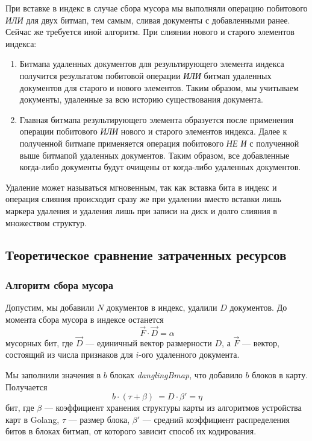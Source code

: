 При вставке в индекс в случае сбора мусора мы выполняли операцию побитового
\textit{ИЛИ} для двух битмап, тем самым, сливая документы с добавленными ранее.
Сейчас же требуется иной алгоритм. При слиянии нового и старого элементов
индекса:
\begin{enumerate}
    \item Битмапа удаленных документов для результирующего элемента индекса
    получится результатом побитовой операции \textit{ИЛИ} битмап удаленных
    документов для старого и нового элементов. Таким образом, мы учитываем
    документы, удаленные за всю историю существования документа.
    \item Главная битмапа результирующего элемента образуется после применения
    операции побитового \textit{ИЛИ} нового и старого элементов индекса. Далее к 
    полученной битмапе применяется операция побитового \textit{НЕ И} с полученной
    выше битмапой удаленных документов. Таким образом, все добавленные когда-либо
    документы будут очищены от когда-либо удаленных документов. 
\end{enumerate}

Удаление может называться мгновенным, так как вставка бита в индекс и операция
слияния происходит сразу же при удалении вместо вставки лишь маркера удаления и
удаления лишь при записи на диск и долго слияния в множеством структур.

\subsection{Теоретическое сравнение затраченных ресурсов}
\label{theory}
\subsubsection{Алгоритм сбора мусора}

Допустим, мы добавили $N$ документов в индекс, удалили $D$ документов.
До момента сбора мусора в индексе останется
\begin{equation}
    \label{alpha}
    \vec{F} \cdot \vec{D} = \alpha
\end{equation}
мусорных бит, где $\vec{D}$ — единичный вектор размерности $D$, 
а $\vec{F}$ — вектор, состоящий из числа признаков для $i$-ого удаленного документа.

Мы заполнили значения в $b$ блоках \textit{danglingBmap}, что добавило $b$ блоков в карту.
Получается 
\begin{equation}
    \label{eta}
    b \cdot (\tau + \beta) ~= D \cdot \beta' = \eta
\end{equation}
бит, где $\beta$ — коэффициент хранения структуры карты из алгоритмов устройства
карт в Golang, $\tau$ — размер блока, $\beta'$ —  средний коэффициент
распределения битов в блоках битмап, от которого зависит способ их кодирования.

